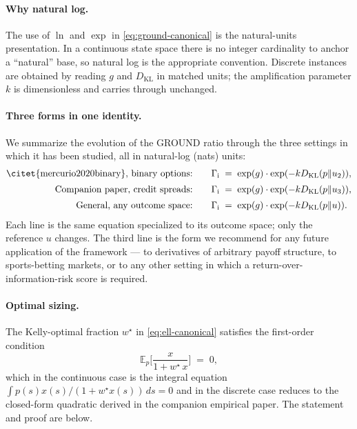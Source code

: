 \documentclass[11pt]{article}
\theoremstyle{definition}
\theoremstyle{remark}
\newcommand{\E}{\mathbb{E}}
\newcommand{\G}{g}
\newcommand{\KL}{D_{\mathrm{KL}}}
\newcommand{\GROUND}{\Gamma_{\mathrm{i}}}
\begin{document}
\paragraph{Why natural log.} The use of $\ln$ and $\exp$ in
\eqref{eq:ground-canonical} is the natural-units presentation. In a
continuous state space there is no integer cardinality to anchor a
``natural'' base, so natural log is the appropriate convention.
Discrete instances are obtained by reading $\G$ and $\KL$ in matched
units; the amplification parameter $k$ is dimensionless and carries
through unchanged.

\paragraph{Three forms in one identity.} We summarize the evolution
of the GROUND ratio through the three settings in which it has been
studied, all in natural-log (nats) units:
\begin{align*}
\text{\citet{mercurio2020binary}, binary options:} \qquad
&\GROUND \;=\; \exp(\G) \cdot \exp(-k \KL(p \| u_2)), \\[2pt]
\text{Companion paper, credit spreads:} \qquad
&\GROUND \;=\; \exp(\G) \cdot \exp(-k \KL(p \| u_3)), \\[2pt]
\text{General, any outcome space:} \qquad
&\GROUND \;=\; \exp(\G) \cdot \exp(-k \KL(p \| u)).
\end{align*}
Each line is the same equation specialized to its outcome space; only
the reference $u$ changes. The third line is the form we recommend
for any future application of the framework --- to derivatives of
arbitrary payoff structure, to sports-betting markets, or to any other
setting in which a return-over-information-risk score is required.

\paragraph{Optimal sizing.} The Kelly-optimal fraction $w^\star$
in \eqref{eq:ell-canonical} satisfies the first-order condition
\begin{equation}
\E_p\!\biggl[\frac{x}{1 + w^\star \, x}\biggr] \;=\; 0,
\label{eq:cts-foc}
\end{equation}
which in the continuous case is the integral equation
$\int p(s) x(s) / (1 + w^\star x(s)) \, ds = 0$ and in the discrete
case reduces to the closed-form quadratic derived in the companion
empirical paper. The statement and proof are below.
\end{document}

